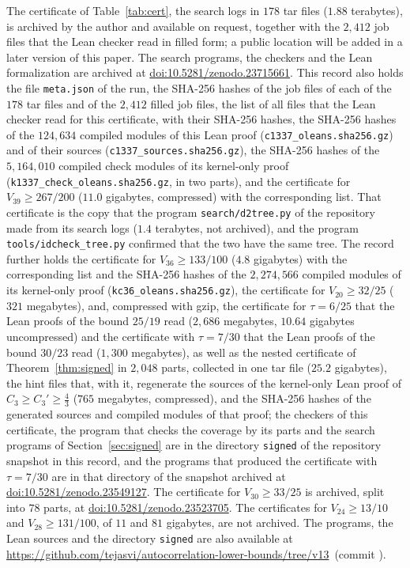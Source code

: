\documentclass[11pt]{amsart}
\theoremstyle{definition}
\theoremstyle{remark}
\numberwithin{equation}{section}
\newcommand{\SuppDOI}{10.5281/zenodo.23715661}
\def\RepoCommit{}
\newcommand{\RepoLink}{\url{https://github.com/tejasvi/autocorrelation-lower-bounds/tree/v13}\ifx\RepoCommit\empty\else\ (commit \texttt{\RepoCommit})\fi}
\newcommand{\CthrPFrac}{\tfrac43}
\newcommand{\QTabGB}{25.2}
\newcommand{\LeanSigSlash}{25/19}
\newcommand{\LeanQKData}{, the hint files that, with it, regenerate the sources of the kernel-only Lean proof of $C_3\ge C_3'\ge\CthrPFrac$ ($765$ megabytes, compressed), and the SHA-256 hashes of the generated sources and compiled modules of that proof}
\newcommand{\TabMB}{2{,}686}
\newcommand{\TabGBun}{10.64}
\begin{document}
The certificate of Table~\ref{tab:cert}, the search logs in $178$ tar files ($1.88$ terabytes), is archived by the author and available on request, together with the $2{,}412$ job files that the Lean checker read in filled form; a public location will be added in a later version of this paper. The search programs, the checkers and the Lean formalization are archived at \href{https://doi.org/\SuppDOI}{doi:\SuppDOI}. This record also holds the file \texttt{meta.json} of the run, the SHA-256 hashes of the job files of each of the $178$ tar files and of the $2{,}412$ filled job files, the list of all files that the Lean checker read for this certificate, with their SHA-256 hashes, the SHA-256 hashes of the $124{,}634$ compiled modules of this Lean proof (\texttt{c1337\_oleans.sha256.gz}) and of their sources (\texttt{c1337\_sources.sha256.gz}), the SHA-256 hashes of the $5{,}164{,}010$ compiled check modules of its kernel-only proof (\texttt{k1337\_check\_oleans.sha256.gz}, in two parts), and the certificate for $V_{39}\ge267/200$ ($11.0$ gigabytes, compressed) with the corresponding list. That certificate is the copy that the program \texttt{search/d2tree.py} of the repository made from its search logs ($1.4$ terabytes, not archived), and the program \texttt{tools/idcheck\_tree.py} confirmed that the two have the same tree. The record further holds the certificate for $V_{36}\ge133/100$ ($4.8$ gigabytes) with the corresponding list and the SHA-256 hashes of the $2{,}274{,}566$ compiled modules of its kernel-only proof (\texttt{kc36\_oleans.sha256.gz}), the certificate for $V_{20}\ge32/25$ ($321$ megabytes), and, compressed with gzip, the certificate for $\tau=6/25$ that the Lean proofs of the bound $\LeanSigSlash$ read ($\TabMB$ megabytes, $\TabGBun$ gigabytes uncompressed) and the certificate with $\tau=7/30$ that the Lean proofs of the bound $30/23$ read ($1{,}300$ megabytes), as well as the nested certificate of Theorem~\ref{thm:signed} in $2{,}048$ parts, collected in one tar file ($\QTabGB$ gigabytes)\LeanQKData; the checkers of this certificate, the program that checks the coverage by its parts and the search programs of Section~\ref{sec:signed} are in the directory \texttt{signed} of the repository snapshot in this record, and the programs that produced the certificate with $\tau=7/30$ are in that directory of the snapshot archived at \href{https://doi.org/10.5281/zenodo.23549127}{doi:10.5281/zenodo.23549127}. The certificate for $V_{30}\ge33/25$ is archived, split into $78$ parts, at \href{https://doi.org/10.5281/zenodo.23523705}{doi:10.5281/zenodo.23523705}. The certificates for $V_{24}\ge13/10$ and $V_{28}\ge131/100$, of $11$ and $81$ gigabytes, are not archived. The programs, the Lean sources and the directory \texttt{signed} are also available at \RepoLink.
\end{document}
